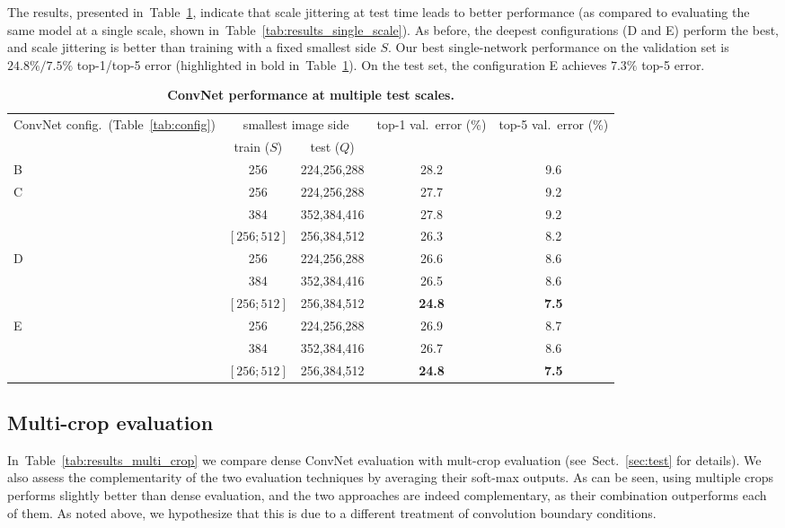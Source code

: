 \documentclass{article} %
\newcommand{\tblref}[1]{Table~\ref{#1}}
\newcommand{\sref}[1]{Sect.~\ref{#1}}
\begin{document}
The results, presented in~\tblref{tab:results_multi_scale}, indicate that scale jittering at test time leads to better performance (as compared to evaluating 
the same model at a single scale, shown in~\tblref{tab:results_single_scale}). 
As before, the deepest configurations (D and E) perform the best, and scale jittering is better than training with a fixed smallest side $S$.
Our best single-network performance on the validation set is $24.8\%/7.5\%$ top-1/top-5 error (highlighted in bold in~\tblref{tab:results_multi_scale}).
On the test set, the configuration E achieves $7.3\%$ top-5 error.

\vspace{-1em}

\begin{table}[htb]
\small
\centering
\caption{\textbf{ConvNet performance at multiple test scales.}
}
\begin{tabular}{|l|c|c|c|c|} \hline
ConvNet config.\ (\tblref{tab:config}) & \multicolumn{2}{c|}{smallest image side} & top-1 val.\ error (\%) & top-5 val.\ error (\%) \\ \cline{2-3}
& train ($S$) & test ($Q$) & & \\ \hline
B & 256 & 224,256,288 & 28.2 & 9.6  \\ \hline
\multirow{3}{*}{C} & 256 & 224,256,288 & 27.7 & 9.2  \\ \cline{2-5}
 & 384 & 352,384,416 & 27.8 & 9.2  \\ \cline{2-5}
 & $\left[256;512\right]$ & 256,384,512 & 26.3 & 8.2  \\ \hline 
\multirow{3}{*}{D} & 256 & 224,256,288 & 26.6  & 8.6  \\ \cline{2-5}
 & 384 & 352,384,416 & 26.5  & 8.6  \\ \cline{2-5}
 & $\left[256;512\right]$ & 256,384,512 & \textbf{24.8}  & \textbf{7.5}  \\ \hline 
\multirow{3}{*}{E} & 256 & 224,256,288 & 26.9  & 8.7  \\ \cline{2-5}
 & 384 & 352,384,416 & 26.7  & 8.6  \\ \cline{2-5}
 & $\left[256;512\right]$ & 256,384,512 & \textbf{24.8}  & \textbf{7.5}  \\ \hline 
\end{tabular}
\label{tab:results_multi_scale}
\end{table}

\subsection{Multi-crop evaluation}
\label{sec:multi-crop}
In~\tblref{tab:results_multi_crop} we compare dense ConvNet evaluation with mult-crop evaluation (see~\sref{sec:test} for details). We also assess the complementarity of the two evaluation techniques by averaging their soft-max outputs. As can be seen, using multiple crops performs slightly better than dense evaluation, and the two approaches are indeed complementary, as their combination outperforms each of them. As noted above, we hypothesize that this is due to a different treatment of convolution boundary conditions.
\end{document}

